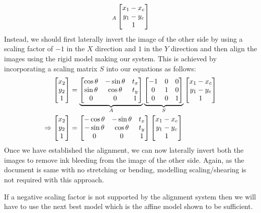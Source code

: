 \documentclass[a4paper]{article}
\begin{document}
\begin{enumerate}[label=(\alph*)]
\begin{equation}{\label{eq:rigid}}
{		}_{A}
		\begin{bmatrix}
			x_1-x_c\\y_1 - y_c\\1
		\end{bmatrix}
	\end{equation}
	Instead, we should first laterally invert the image of the other side by using a scaling factor of $-1$ in the $X$ direction and $1$ in the $Y$ direction and then align the images using the rigid model making our system. This is achieved by incorporating a scaling matrix $S$ into our equations as follows:
	\begin{align}{\label{eq:rigidunequalscaling}}
		\begin{bmatrix}
			x_2\\y_2\\1
		\end{bmatrix}
		&=
		\underbrace{
		\begin{bmatrix}
			\cos\theta & -\sin\theta & t_x\\
			\sin\theta & \cos\theta  & t_y\\
			0          & 0           & 1\\
		\end{bmatrix}
		}_{A}
		\underbrace{
		\begin{bmatrix}
			-1 & 0 & 0\\
			 0 & 1 & 0\\
			 0 & 0 & 1\\
		\end{bmatrix}
		}_{S}
		\begin{bmatrix}
			x_1-x_c\\y_1 - y_c\\1
		\end{bmatrix}
		\\
		\Rightarrow
		\begin{bmatrix}
			x_2\\y_2\\1
		\end{bmatrix}
		&=
		\begin{bmatrix}
			-\cos\theta & -\sin\theta & t_x\\
			-\sin\theta &  \cos\theta & t_y\\
			 0          &  0          & 1\\
		\end{bmatrix}
		\begin{bmatrix}
			x_1-x_c\\y_1 - y_c\\1
		\end{bmatrix}
	\end{align}
	Once we have established the alignment, we can now laterally invert both the images to remove ink bleeding from the image of the other side. Again, as the document is same with no stretching or bending, modelling scaling/shearing is not required with this approach.

	If a negative scaling factor is not supported by the alignment system then we will have to use the next best model which is the affine model shown to be sufficient.
\end{enumerate}
\end{document}
